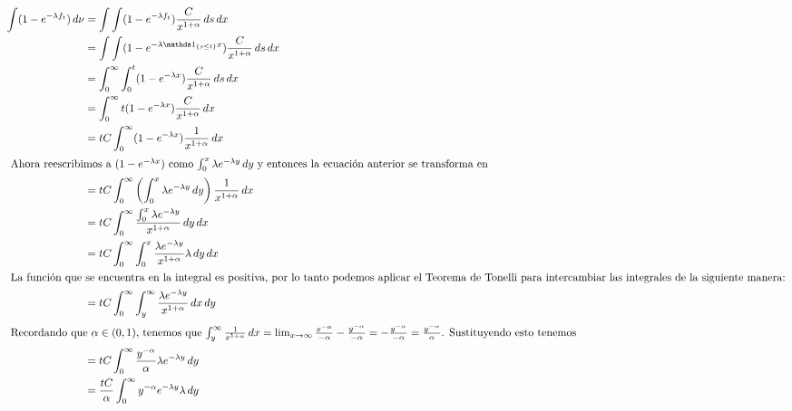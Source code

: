 \begin{align}
    \int (1-e^{-\lambda f_t}) \,d\nu    &=  \int \int (1-e^{-\lambda f_t})\frac{C}{x^{1+\alpha}}\,ds\,dx                                        \\
                                        &=  \int \int (1-e^{-\lambda \indic_{\{s \leq t\}} x})\frac{C}{x^{1+\alpha}}\,ds\,dx                    \\
                                        &=  \int_0^\infty \int_0^t (1-e^{-\lambda  x})\frac{C}{x^{1+\alpha}}\,ds\,dx                            \\
                                        &=  \int_0^\infty t (1-e^{-\lambda  x})\frac{C}{x^{1+\alpha}}\,dx                                       \\
                                        &=  tC \int_0^\infty  (1-e^{-\lambda  x})\frac{1}{x^{1+\alpha}}\,dx                                     \\
    \intertext{
    Ahora reescribimos a $(1-e^{-\lambda  x})$ como $\int_0^x \lambda e^{-\lambda y} \,dy$ y entonces la ecuación 
    anterior se transforma en}
                                        &=  tC \int_0^\infty  \left(\int_0^x  \lambda e^{-\lambda y} \,dy \right)\frac{1}{x^{1+\alpha}}\,dx     \\
                                        &=  tC \int_0^\infty  \frac{\int_0^x  \lambda e^{-\lambda y}}{x^{1+\alpha}}\,dy\,dx                     \\
                                        &=  tC \int_0^\infty  \int_0^x\frac{ \lambda e^{-\lambda y}}{x^{1+\alpha}} \lambda \,dy\,dx                      \\
    \intertext{
    La función que se encuentra en la integral es positiva, por lo tanto podemos aplicar el Teorema de Tonelli 
    para intercambiar las integrales de la siguiente manera:}
                                        &=  tC \int_0^\infty  \int_y^\infty\frac{ \lambda e^{-\lambda y}}{x^{1+\alpha}}\,dx\,dy                 \\
    \intertext{
    Recordando que $\alpha \in (0,1)$, tenemos que 
    $\int_y^\infty\frac{ 1 }{x^{1+\alpha}}\,dx = \lim_{x \rightarrow \infty} \frac{x^{-\alpha}}{-\alpha} - \frac{y^{-\alpha}}{-\alpha} = 
    - \frac{y^{-\alpha}}{-\alpha} = \frac{y^{-\alpha}}{\alpha}$. Sustituyendo esto tenemos}
                                        &=  tC \int_0^\infty  \frac{y^{-\alpha}}{\alpha} \lambda e^{-\lambda y}\,dy                             \\
                                        &=  \frac{tC}{\alpha} \int_0^\infty  y^{-\alpha}  e^{-\lambda y} \lambda\,dy                            \\

\end{align}
